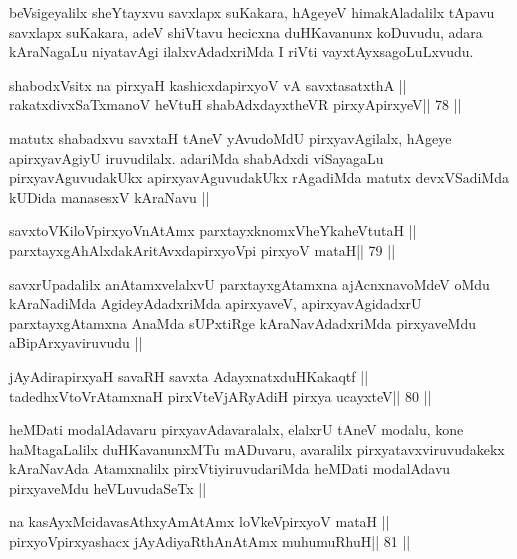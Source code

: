 \begin{artha}
  beVsigeyalilx sheYtayxvu savxlapx suKakara, hAgeyeV himakAladalilx
  tApavu savxlapx suKakara, adeV shiVtavu hecicxna duHKavanunx
  koDuvudu, adara kAraNagaLu niyatavAgi ilalxvAdadxriMda I
  riVti vayxtAyxsagoLuLxvudu.
\end{artha}

\begin{shl}
shabodxV\s sitx na pirxyaH kashicxdapirxyoV vA savxtasatxthA ||
rakatxdivxSaTxmanoV heVtuH shabAdxdayxtheVR pirxyApirxyeV\hfill || 78 ||
\end{shl}

\begin{artha}
matutx shabadxvu savxtaH tAneV yAvudoMdU pirxyavAgilalx, hAgeye
apirxyavAgiyU iruvudilalx. adariMda shabAdxdi viSayagaLu
pirxyavAguvudakUkx apirxyavAguvudakUkx rAgadiMda matutx devxVSadiMda
kUDida manasesxV kAraNavu ||
\end{artha}


\begin{shl}
savxtoV\s KiloV\s pirxyoV\s nAtAmx parxtayxknomxVheYkaheVtutaH ||
parxtayxgAhAlxdakAritAvxdapirxyoV\s pi pirxyoV mataH\hfill || 79 ||
\end{shl}

\begin{artha}
savxrUpadalilx anAtamxvelalxvU parxtayxgAtamxna ajAcnxnavoMdeV oMdu
kAraNadiMda AgideyAdadxriMda apirxyaveV, apirxyavAgidadxrU
parxtayxgAtamxna AnaMda sUPxtiRge kAraNavAdadxriMda pirxyaveMdu
aBipArxyaviruvudu ||
\end{artha}

\begin{shl}
jAyAdirapirxyaH savaRH savxta AdayxnatxduHKakaqtf ||
tadedhxVtoVrAtamxnaH pirxVteVjARyAdiH pirxya ucayxteV\hfill || 80 ||
\end{shl}

\begin{artha}
heMDati modalAdavaru pirxyavAdavaralalx, elalxrU tAneV modalu, kone
haMtagaLalilx duHKavanunxMTu mADuvaru, avaralilx
pirxyatavxviruvudakekx kAraNavAda Atamxnalilx pirxVtiyiruvudariMda
heMDati modalAdavu pirxyaveMdu heVLuvudaSeTx ||
\end{artha}

\begin{shl}
na kasAyxMcidavasAthxyAmAtAmx loVkeV\s pirxyoV mataH ||
pirxyoV\s pirxyashacx jAyAdiyaRthA\s nAtAmx muhumuRhuH\hfill || 81 ||
\end{shl}

